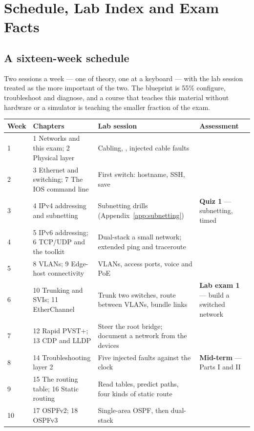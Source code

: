 \chapter{Schedule, Lab Index and Exam Facts}\label{app:schedule}

\section{A sixteen-week schedule}

Two sessions a week --- one of theory, one at a keyboard --- with the lab session
treated as the more important of the two. The blueprint is 55\% configure,
troubleshoot and diagnose, and a course that teaches this material without
hardware or a simulator is teaching the smaller fraction of the exam.

\begin{longtable}{@{}L{1.5cm}L{5.2cm}L{4.4cm}L{3.6cm}@{}}
\toprule
{}
\textbf{Week} & \textbf{Chapters} & \textbf{Lab session} & \textbf{Assessment} \\
\midrule
{} & 1 Networks and this exam; 2 Physical layer &
Cabling, , injected cable faults & \\
2 & 3 Ethernet and switching; 7 The IOS command line &
First switch: hostname, SSH, save & \\
3 & 4 IPv4 addressing and subnetting &
Subnetting drills (Appendix~\ref{app:subnetting}) & \textbf{Quiz 1} --- subnetting,
timed \\
4 & 5 IPv6 addressing; 6 TCP/UDP and the toolkit &
Dual-stack a small network; extended ping and traceroute & \\
5 & 8 VLANs; 9 Edge-host connectivity &
VLANs, access ports, voice and PoE & \\
6 & 10 Trunking and SVIs; 11 EtherChannel &
Trunk two switches, route between VLANs, bundle links & \textbf{Lab exam 1} ---
build a switched network \\
7 & 12 Rapid PVST+; 13 CDP and LLDP &
Steer the root bridge; document a network from the devices & \\
8 & 14 Troubleshooting layer 2 &
Five injected faults against the clock & \textbf{Mid-term} --- Parts I and II \\
9 & 15 The routing table; 16 Static routing &
Read tables, predict paths, four kinds of static route & \\
10 & 17 OSPFv2; 18 OSPFv3 &
Single-area OSPF, then dual-stack & \\

\end{longtable}
